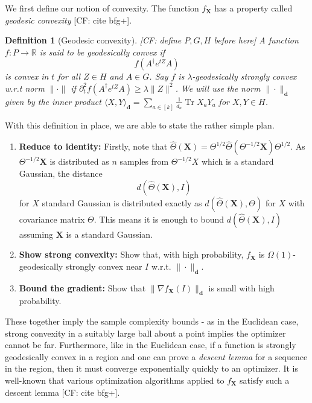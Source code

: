 \documentclass{article}
\newtheorem{definition}{Definition}
\newcommand{\R}{{\mathbb{R}}}
\renewcommand{\vec}{\bm}
\newcommand\tr{\operatorname{Tr}}
\newcommand{\CF}[1]{{\color{purple}[CF: #1]}}
\begin{document}
We first define our notion of convexity. The function $f_{\vec X}$ has a property called \emph{geodesic convexity} \CF{cite bfg+}. 
\begin{definition}[Geodesic convexity]\CF{define $P,G,H$ before here} A function $f:P \to \R$ is said to be geodesically convex if  
$$f(A^\dagger e^{t Z} A)$$ is convex in $t$ for all $Z \in H$ and $A\in G$. Say $f$ is $\lambda$-geodesically \emph{strongly convex} w.r.t norm $\|\cdot\|$ if $\partial^2_t f(A^\dagger e^{t Z} A) \geq \lambda \|Z\|^{2}$. We will use the norm $\| \cdot\|_{\vec d}$ given by the inner product $\langle X, Y \rangle_{\vec d} = \sum_{a \in [k]} \frac{1}{d_a} \tr X_a Y_a $ for $X, Y \in H$. 
\end{definition} 
With this definition in place, we are able to state the rather simple plan. 
\begin{enumerate}
\item\label{it:reduce} \textbf{Reduce to identity: } Firstly, note that $\widehat{\Theta}(\vec X) = \Theta^{1/2} \hat{\Theta}(\Theta^{-1/2} \vec X) \Theta^{1/2}$. As $\Theta^{-1/2} \vec X$ is distributed as $n$ samples from $\Theta^{-1/2}X$ which is a standard Gaussian, the distance 
$$ d(\hat{\Theta}(\vec X), I)$$
for $X$ standard Gaussian is distributed exactly as $d(\hat{\Theta}(\vec X), \Theta)$ for $X$ with covariance matrix $\Theta$. This means it is enough to bound $d(\hat{\Theta}(\vec X), I)$ assuming $\vec X$ is a standard Gaussian.
\item \textbf{Show strong convexity: } Show that, with high probability, $f_{\vec X}$ is $\Omega(1)$-geodesically strongly convex near $I$ w.r.t. $\|\cdot\|_{\vec d}$.
\item \textbf{Bound the gradient: } Show that $\| \nabla f_{\vec X} (I) \|_{\vec d}$ is small with high probability.

\end{enumerate}
These together imply the sample complexity bounds - as in the Euclidean case, strong convexity in a suitably large ball about a point implies the optimizer cannot be far. Furthermore, like in the Euclidean case, if a function is strongly geodesically convex in a region and one can prove a \emph{descent lemma} for a sequence in the region, then it must converge exponentially quickly to an optimizer. It is well-known that various optimization algorithms applied to $f_{\vec X}$ satisfy such a descent lemma \CF{cite bfg+}.
\end{document}
